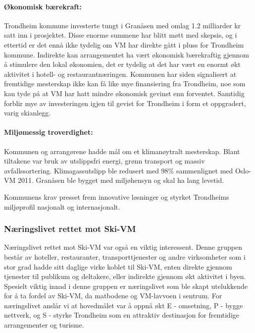 \paragraph{Økonomisk bærekraft:} Trondheim kommune investerte tungt i Granåsen med omlag 1.2 
milliarder kr satt inn i prosjektet\cite{NRK12Milliarder}. Disse enorme summene har blitt møtt med skepsis,
og i ettertid er det ennå ikke tydelig om VM har direkte gått i pluss for Trondheim kommune\cite{AftenpostenNyVM}. 
Indirekte kan arrangementet ha vært økonomisk bærekraftig gjennom å stimulere den lokal 
økonomien, det er tydelig at det har vært en enormt økt aktivitet i hotell- og 
restaurantnæringen\cite{DagbladetPriser}. Kommunen har siden signalisert at fremtidige mesterskap ikke
kan få like mye finansiering fra Trondheim\cite{NeaRadioVM}, noe som kan tyde på at VM har hatt mindre økonomisk 
gevinst enn forventet. Samtidig forblir mye av investeringen igjen til gevist for Trondheim i form 
et oppgradert, varig skianlegg.

\paragraph{Miljømessig troverdighet:} Kommunen og arrangørene hadde mål om et klimanøytralt 
mesterskap\cite{TrondheimKommuneVM}. Blant tiltakene var bruk av utslippsfri energi, grønn 
transport og massiv avfallssortering. Klimagassutslipp ble redusert med 98\% sammenlignet 
med Oslo-VM 2011\cite{Trondheim2025Kutt}. Granåsen ble bygget med miljøhensyn og skal ha lang levetid. 

Kommunens krav presset frem innovative løsninger og styrket Trondheims
miljøprofil nasjonalt og internasjonalt.

\subsubsection{Næringslivet rettet mot Ski-VM}
Næringslivet rettet mot Ski-VM var også en viktig interessent. Denne gruppen består av 
hoteller, restauranter, transporttjenester og andre virksomheter som i stor grad hadde sitt 
daglige virke koblet til Ski-VM, enten direkte gjennom tjenester til publikum og deltakere, 
eller indirekte gjennom økt aktivitet i byen. Spesielt viktig innad i denne gruppen er 
næringslivet som ble skapt utelukkende for å ta fordel av Ski-VM, da matbodene og VM-lavvoen 
i sentrum. For næringslivet anslår vi at hovedmålet var å oppnå økt E - omsetning, P - bygge nettverk, og 
S - styrke Trondheim som en attraktiv destinasjon for fremtidige arrangementer og turisme.


